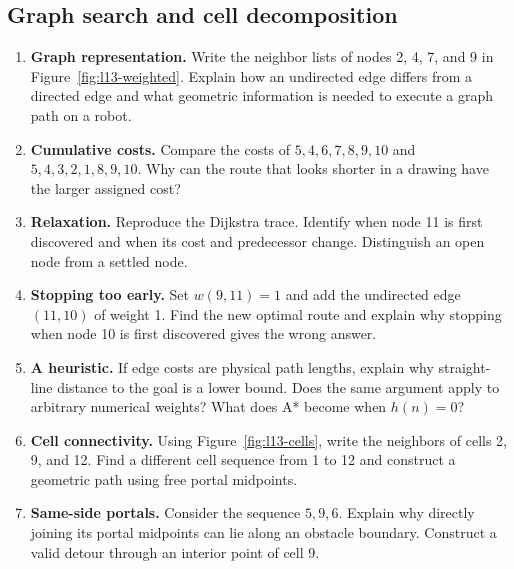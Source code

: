 \subsection{Graph search and cell decomposition}
\begin{enumerate}
\item \textbf{Graph representation.} Write the neighbor lists of nodes 2,
4, 7, and 9 in Figure~\ref{fig:l13-weighted}. Explain how an undirected
edge differs from a directed edge and what geometric information is needed
to execute a graph path on a robot.
\item \textbf{Cumulative costs.} Compare the costs of
$5,4,6,7,8,9,10$ and $5,4,3,2,1,8,9,10$. Why can the route that looks
shorter in a drawing have the larger assigned cost?
\item \textbf{Relaxation.} Reproduce the Dijkstra trace. Identify when
node 11 is first discovered and when its cost and predecessor change.
Distinguish an open node from a settled node.
\item \textbf{Stopping too early.} Set $w(9,11)=1$ and add the undirected
edge $(11,10)$ of weight 1. Find the new optimal route and explain why
stopping when node 10 is first discovered gives the wrong answer.
\item \textbf{A heuristic.} If edge costs are physical path lengths,
explain why straight-line distance to the goal is a lower bound. Does the
same argument apply to arbitrary numerical weights? What does A* become
when $h(n)=0$?
\item \textbf{Cell connectivity.} Using Figure~\ref{fig:l13-cells}, write
the neighbors of cells 2, 9, and 12. Find a different cell sequence from
1 to 12 and construct a geometric path using free portal midpoints.
\item \textbf{Same-side portals.} Consider the sequence $5,9,6$.
Explain why directly joining its portal midpoints can lie along an obstacle
boundary. Construct a valid detour through an interior point of cell 9.
\end{enumerate}

\clearpage

